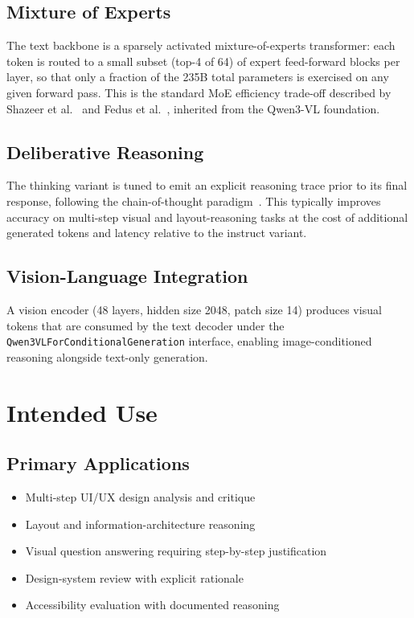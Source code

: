 \documentclass[11pt,a4paper]{article}
\begin{document}
\subsection{Mixture of Experts}
The text backbone is a sparsely activated mixture-of-experts transformer: each token is routed
to a small subset (top-4 of 64) of expert feed-forward blocks per layer, so that only a fraction
of the 235B total parameters is exercised on any given forward pass. This is the standard MoE
efficiency trade-off described by Shazeer et al.~\cite{shazeer2017outrageously} and
Fedus et al.~\cite{fedus2022switch}, inherited from the Qwen3-VL foundation.

\subsection{Deliberative Reasoning}
The thinking variant is tuned to emit an explicit reasoning trace prior to its final response,
following the chain-of-thought paradigm~\cite{wei2022chain}. This typically improves accuracy on
multi-step visual and layout-reasoning tasks at the cost of additional generated tokens and
latency relative to the instruct variant.

\subsection{Vision-Language Integration}
A vision encoder (48 layers, hidden size 2048, patch size 14) produces visual tokens that are
consumed by the text decoder under the \texttt{Qwen3VLForConditionalGeneration} interface,
enabling image-conditioned reasoning alongside text-only generation.

\section{Intended Use}

\subsection{Primary Applications}
\begin{itemize}
    \item Multi-step UI/UX design analysis and critique
    \item Layout and information-architecture reasoning
    \item Visual question answering requiring step-by-step justification
    \item Design-system review with explicit rationale
    \item Accessibility evaluation with documented reasoning
\end{itemize}
\end{document}
